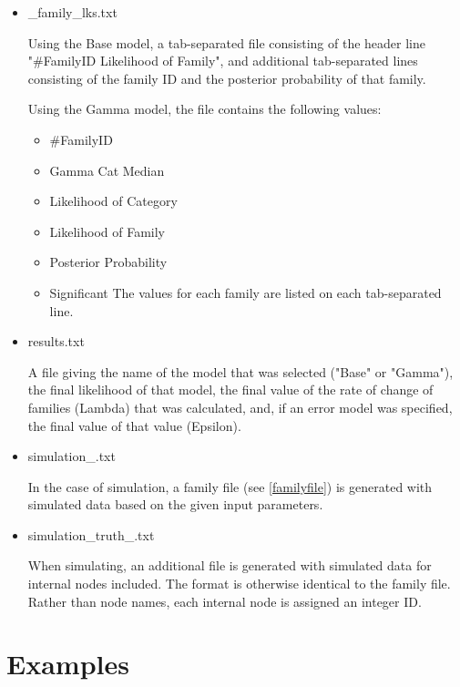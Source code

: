 \documentclass{article}
\begin{document}
\begin{itemize}
\item{\_family\_lks.txt}

Using the Base model, a tab-separated file consisting of the header line "\#FamilyID Likelihood of Family", and additional tab-separated lines consisting of the family ID and the posterior probability of that family.

Using the Gamma model, the file contains the following values:

\begin{itemize}
\item{\#FamilyID}
\item{Gamma Cat Median}
\item{Likelihood of Category}
\item{Likelihood of Family}
\item{Posterior Probability}
\item{Significant}
The values for each family are listed on each tab-separated line.
\end{itemize}

\item{results.txt}

A file giving the name of the model that was selected ("Base" or "Gamma"), the final likelihood of that model, the final value of the rate of change of families (Lambda) that was calculated, and, if an error model was specified, the final value of that value (Epsilon).

\item{simulation\_.txt}

In the case of simulation, a family file (see \ref{familyfile}) is generated with simulated data based on the given input parameters. 

\item{simulation\_truth\_.txt}

When simulating, an additional file is generated with simulated data for internal nodes included. The format is otherwise identical to the family file. Rather than node names, each internal node is assigned an integer ID.

\end{itemize}

\section{Examples}
\end{document}
